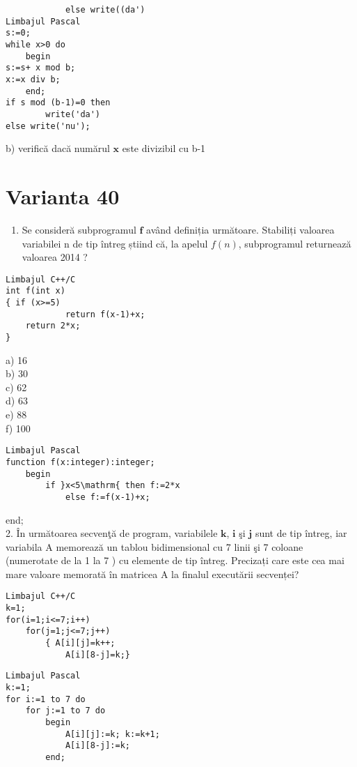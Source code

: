 \begin{verbatim}
            else write((da')
Limbajul Pascal
s:=0;
while x>0 do
    begin
s:=s+ x mod b;
x:=x div b;
    end;
if s mod (b-1)=0 then
        write('da')
else write('nu');
\end{verbatim}

b) verifică dacă numărul $\mathbf{x}$ este divizibil cu b-1

\section*{Varianta 40}
\begin{enumerate}
  \item Se consideră subprogramul $\mathbf{f}$ având definiția următoare. Stabiliți valoarea variabilei n de tip întreg știind că, la apelul $f(n)$, subprogramul returnează valoarea 2014 ?
\end{enumerate}

\begin{verbatim}
Limbajul C++/C
int f(int x)
{ if (x>=5)
            return f(x-1)+x;
    return 2*x;
}
\end{verbatim}

a) 16\\
b) 30\\
c) 62\\
d) 63\\
e) 88\\
f) 100

\begin{verbatim}
Limbajul Pascal
function f(x:integer):integer;
    begin
        if }x<5\mathrm{ then f:=2*x
            else f:=f(x-1)+x;
\end{verbatim}

end;\\
2. În următoarea secvenţă de program, variabilele $\mathbf{k}$, $\mathbf{i}$ şi $\mathbf{j}$ sunt de tip întreg, iar variabila A memorează un tablou bidimensional cu 7 linii şi 7 coloane (numerotate de la 1 la 7 ) cu elemente de tip întreg. Precizați care este cea mai mare valoare memorată în matricea A la finalul executării secvenței?

\begin{verbatim}
Limbajul C++/C
k=1;
for(i=1;i<=7;i++)
    for(j=1;j<=7;j++)
        { A[i][j]=k++;
            A[i][8-j]=k;}
\end{verbatim}

\begin{verbatim}
Limbajul Pascal
k:=1;
for i:=1 to 7 do
    for j:=1 to 7 do
        begin
            A[i][j]:=k; k:=k+1;
            A[i][8-j]:=k;
        end;
\end{verbatim}


